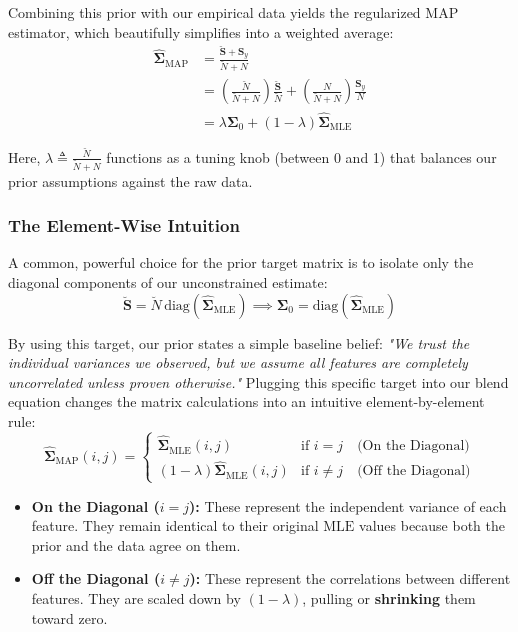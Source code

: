 \documentclass{article}
\begin{document}
Combining this prior with our empirical data yields the regularized $\text{MAP}$ estimator, which beautifully simplifies into a weighted average:
\begin{align}
\hat{\boldsymbol{\Sigma}}_{\text{MAP}} &= \frac{\breve{\mathbf{S}} + \mathbf{S}_y}{\breve{N} + N} \\[2mm]
&= \left( \frac{\breve{N}}{\breve{N} + N} \right) \frac{\breve{\mathbf{S}}}{\breve{N}} + \left( \frac{N}{\breve{N} + N} \right) \frac{\mathbf{S}_y}{N} \\[2mm]
&= \lambda \boldsymbol{\Sigma}_0 + (1 - \lambda)\hat{\boldsymbol{\Sigma}}_{\text{MLE}}
\end{align}

Here, $\lambda \triangleq \frac{\breve{N}}{\breve{N} + N}$ functions as a tuning knob (between 0 and 1) that balances our prior assumptions against the raw data.

\subsubsection{The Element-Wise Intuition}
A common, powerful choice for the prior target matrix is to isolate only the diagonal components of our unconstrained estimate:
\begin{equation}
\breve{\mathbf{S}} = \breve{N} \, \text{diag}(\hat{\boldsymbol{\Sigma}}_{\text{MLE}}) \implies \boldsymbol{\Sigma}_0 = \text{diag}(\hat{\boldsymbol{\Sigma}}_{\text{MLE}})
\end{equation}

By using this target, our prior states a simple baseline belief: \textit{"We trust the individual variances we observed, but we assume all features are completely uncorrelated unless proven otherwise."} Plugging this specific target into our blend equation changes the matrix calculations into an intuitive element-by-element rule:
\begin{equation}
\hat{\boldsymbol{\Sigma}}_{\text{MAP}}(i, j) = 
\begin{cases} 
\hat{\boldsymbol{\Sigma}}_{\text{MLE}}(i, j) & \text{if } i = j \quad \text{(On the Diagonal)} \\[1mm]
(1 - \lambda)\hat{\boldsymbol{\Sigma}}_{\text{MLE}}(i, j) & \text{if } i \neq j \quad \text{(Off the Diagonal)}
\end{cases}
\end{equation}

\begin{itemize}
    \item \textbf{On the Diagonal ($i = j$):} These represent the independent variance of each feature. They remain identical to their original $\text{MLE}$ values because both the prior and the data agree on them.
    \item \textbf{Off the Diagonal ($i \neq j$):} These represent the correlations between different features. They are scaled down by $(1 - \lambda)$, pulling or \textbf{shrinking} them toward zero.
\end{itemize}
\end{document}
